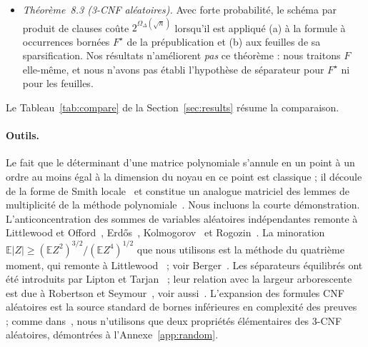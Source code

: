 \documentclass[11pt,a4paper]{article}
\theoremstyle{definition}
\theoremstyle{remark}
\newcommand{\E}{\mathbb{E}}
\newcommand{\sep}{\operatorname{sep}}
\newcommand{\tw}{\operatorname{tw}}
\begin{document}
\begin{itemize}
 arborescente primale, et une 3-CNF aléatoire avec $\Delta>3$ a une largeur arborescente
 primale linéaire avec forte probabilité. Un graphe de largeur arborescente $\tw$ possède un
 séparateur d'au plus $\tw+1$ sommets laissant des composantes d'au plus $n/2$
 sommets~\cite{RS86,Bod93}, donc $\sep(F)\le\tw+1$, et le Théorème~8.1 de~\cite{DL}
 s'applique aux familles de notre Corollaire~\ref{cor:main}. Il donne $2^{\Omega(\sqrt n)}$
 pour un schéma appliqué à $F$ elle-même. C'est la comparaison équitable pour notre
 $2^{\Omega(n^{2/3})}$, qui ne vaut que dans le modèle de type produit.
 Notre Lemme~\ref{lem:random} adapte la démonstration de leur Lemme~8.2 de la largeur
 arborescente aux $2/3$-séparateurs et utilise les deux faits de leur Annexe~A.
\item \emph{Théorème~8.3 (3-CNF aléatoires).} Avec forte probabilité, le schéma par produit
 de clauses coûte $2^{\Omega_\Delta(\sqrt n)}$ lorsqu'il est appliqué (a) à la formule à
 occurrences bornées $F^\star$ de la prépublication et (b) aux feuilles de sa
 sparsification. Nos résultats n'améliorent \emph{pas} ce théorème : nous traitons $F$
 elle-même, et nous n'avons pas établi l'hypothèse de séparateur pour $F^\star$ ni pour les
 feuilles.
\end{itemize}
Le Tableau~\ref{tab:compare} de la Section~\ref{sec:results} résume la comparaison.

\paragraph{Outils.} Le fait que le déterminant d'une matrice polynomiale s'annule en un
point à un ordre au moins égal à la dimension du noyau en ce point est classique ; il
découle de la forme de Smith locale~\cite{GLR82} et constitue un analogue matriciel des
lemmes de multiplicité de la méthode polynomiale~\cite{DKSS13}. Nous incluons la courte
démonstration. L'anticoncentration des sommes de variables aléatoires indépendantes remonte
à Littlewood et Offord~\cite{LO43}, Erd\H{o}s~\cite{Erd45}, Kolmogorov~\cite{Kol58} et
Rogozin~\cite{Rog61}. La minoration $\E|Z|\ge(\E Z^2)^{3/2}/(\E Z^4)^{1/2}$ que nous
utilisons est la méthode du quatrième moment, qui remonte à Littlewood~\cite{Lit30} ; voir
Berger~\cite{Ber97}. Les séparateurs équilibrés ont été introduits par Lipton et
Tarjan~\cite{LT79} ; leur relation avec la largeur arborescente est due à Robertson et
Seymour~\cite{RS86}, voir aussi~\cite{Bod93}. L'expansion des formules CNF aléatoires est la
source standard de bornes inférieures en complexité des preuves~\cite{CS88,BSW01,BSI10} ;
comme dans~\cite{DL}, nous n'utilisons que deux propriétés élémentaires des 3-CNF
aléatoires, démontrées à l'Annexe~\ref{app:random}.
\end{document}
